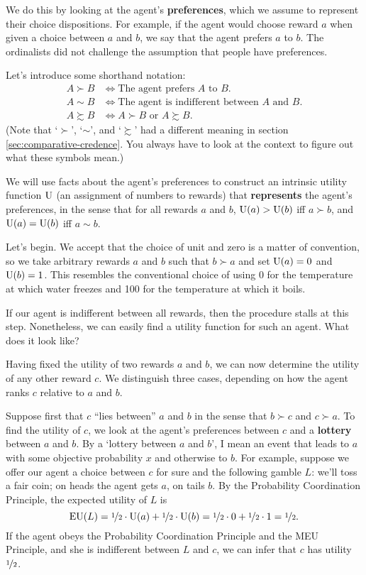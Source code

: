 We do this by looking at the agent's \textbf{preferences}, which we assume to
represent their choice dispositions. For example, if the agent would choose
reward $a$ when given a choice between $a$ and $b$, we say that the agent
prefers $a$ to $b$. The ordinalists did not challenge the assumption that people
have preferences.

Let's introduce some shorthand notation:
%
\begin{align*}
  A \succ B &\Leftrightarrow \text{The agent prefers $A$ to $B$}.\\
  A \sim B &\Leftrightarrow \text{The agent is indifferent between $A$ and $B$.}\\
  A \succsim B & \Leftrightarrow \text{$A \succ B$ or $A \succsim B$.}
\end{align*}
%
(Note that `$\succ$', `$\sim$', and `$\succsim$' had a different meaning in
section \ref{sec:comparative-credence}. You always have to look at the context
to figure out what these symbols mean.)

We will use facts about the agent's preferences to construct an intrinsic
utility function $\text{U}$ (an assignment of numbers to rewards) that
\textbf{represents} the agent's preferences, in the sense that for all rewards
$a$ and $b$, $\text{U}(a) > \text{U}(b)$ iff $a \succ b$, and $\text{U}(a) = \text{U}(b)$ iff
$a \sim b$.

Let's begin. We accept that the choice of unit and zero is a matter of
convention, so we take arbitrary rewards $a$ and $b$ such that $b \succ a$ and
set $\text{U}(a) = 0$ and $\text{U}(b) = 1$. This resembles the conventional choice of using
0 for the temperature at which water freezes and 100 for the temperature at
which it boils.

\begin{exercise}{2}
  If our agent is indifferent between all rewards, then the procedure stalls at
  this step. Nonetheless, we can easily find a utility function for such an
  agent. What does it look like?
\end{exercise}

Having fixed the utility of two rewards $a$ and $b$, we can now determine the
utility of any other reward $c$. We distinguish three cases, depending on how
the agent ranks $c$ relative to $a$ and $b$.

Suppose first that $c$ ``lies between'' $a$ and $b$ in the sense that
$b \succ c$ and $c \succ a$. To find the utility of $c$, we look at the agent's
preferences between $c$ and a \textbf{lottery} between $a$ and $b$. By a
`lottery between $a$ and $b$', I mean an event that leads to $a$ with some
objective probability $x$ and otherwise to $b$. For example, suppose we offer
our agent a choice between $c$ for sure and the following gamble $L$: we'll toss
a fair coin; on heads the agent gets $a$, on tails $b$. By the Probability
Coordination Principle, the expected utility of $L$ is%
\[
  \text{EU}(L) = \nicefrac{1}{2} \cdot \text{U}(a) + \nicefrac{1}{2} \cdot \text{U}(b) =  
   \nicefrac{1}{2} \cdot 0 + \nicefrac{1}{2} \cdot 1 = \nicefrac{1}{2}. 
\]
If the agent obeys the Probability Coordination Principle and the MEU Principle,
and she is indifferent between $L$ and $c$, we can infer that 
$c$ has utility \(\nicefrac{1}{2}\).

